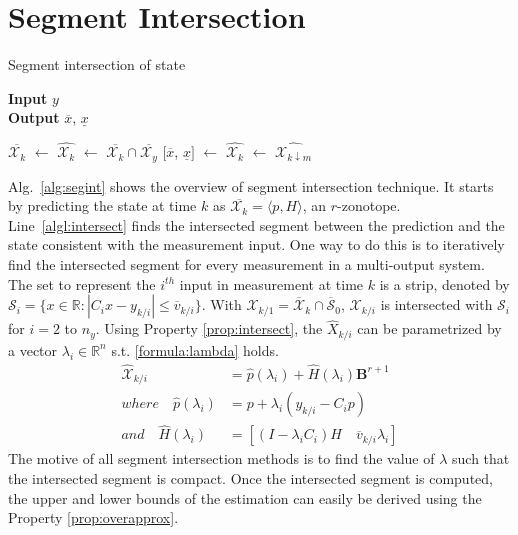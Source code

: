 \section{Segment Intersection} 
\begin{algorithm}[H]
        \caption{Segment intersection of state}
        \textbf{Input} $y$\\
 		\textbf{Output} $\overline{x}$, $\underline{x}$
        \begin{algorithmic}[1]
        \State $\overline{\mathcal{X}_k}$ $\gets$ 
        \State $\hat{\mathcal{X}_{k}}$ $\gets$ $\overline{\mathcal{X}_k} \cap \overline{\mathcal{X}_y}$ \label{algl:intersect}
        \State $[\overline{x}$, $\underline{x}]$ $\gets$ 
        \State $\hat{\mathcal{X}_{k}}$ $\gets$ $\hat{\mathcal{X}_{k\downarrow m}}$ \label{algl:reduce}
        \end{algorithmic}
        \label{alg:segint}
\end{algorithm}
Alg.~\ref{alg:segint} shows the overview of segment intersection technique. It starts by predicting the state at time $k$ as $\overline{\mathcal{X}_k} = \langle p , H \rangle $, an $r$-zonotope. Line~\ref{algl:intersect} finds the intersected segment between the prediction and the state consistent with the measurement input. One way to do this is to iteratively find the intersected segment for every measurement in a multi-output system. The set to represent the $i^{th}$ input in measurement at time $k$  is a strip, denoted by $\mathscr{S}_i = \{x \in \mathbb{R} : |C_i x - y_{k/i}| \leq \overline{v}_{k/i}\}$. With $\mathcal{X}_{k/1} = \overline{\mathcal{X}}_k \cap \overline{\mathscr{S}}_0$, $\mathcal{X}_{k/i}$  is intersected with $\mathscr{S}_i$ for $i=2$ to $n_y$. Using Property \ref{prop:intersect}, the $\hat{X}_{k/i}$ can be parametrized by a vector $\lambda_i \in \mathbb{R}^n$ s.t. \ref{formula:lambda} holds.
\begin{equation}
\label{formula:lambda}
\begin{split}
\mathcal{\hat{X}}_{k/i} &= \hat{p}(\lambda_i) + \hat{H}(\lambda_i)\textbf{B}^{r+1}  \\
where \quad \hat{p}(\lambda_i) &= p+ \lambda_i(y_{k/i} - C_i p)\\
and \quad \hat{H}(\lambda_i) &= [(I- \lambda_i C_i) H \quad \overline{v}_{k/i} \lambda_i ]
\end{split}
\end{equation}
The motive of all segment intersection methods is to find the value of $\lambda$ such that the intersected segment is compact. Once the intersected segment is computed, the upper and lower bounds of the estimation can easily be derived using the Property \ref{prop:overapprox}.

